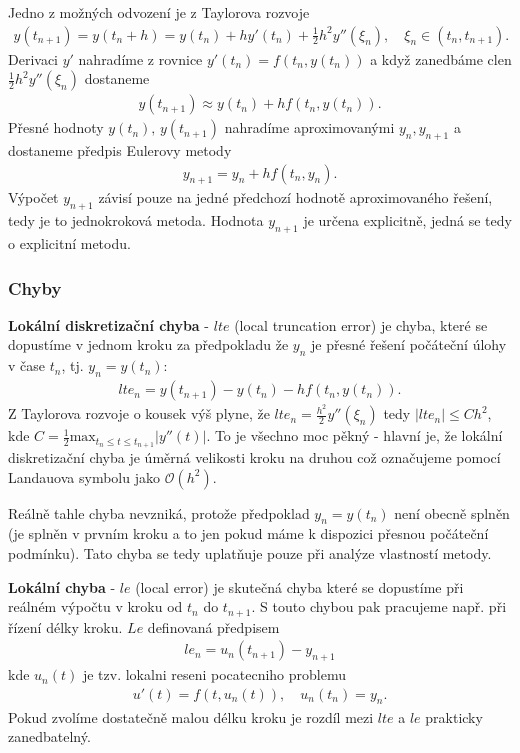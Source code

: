 \documentclass[a4]{report}
\theoremstyle{definition}
\begin{document}
{Jedno z možných odvození je z Taylorova rozvoje
\begin{align}
y(t_{n+1}) = y(t_{n}+h)= y(t_{n})+hy'(t_{n}) + \frac{1}{2} h^{2} y''(\xi_{n}), \quad \xi_{n} \in (t_{n}, t_{n+1}).
\end{align}
Derivaci $y'$ nahradíme z rovnice $y'(t_{n})=f(t_{n},y(t_{n}))$ a když zanedbáme clen $\frac{1}{2} h^{2} y''(\xi_{n})$ dostaneme
\begin{align}
y(t_{n+1}) \approx y(t_{n})+h f(t_{n},y(t_{n})).
\end{align}
Přesné hodnoty $y(t_{n}), \, y(t_{n+1})$ nahradíme aproximovanými $y_{n}, y_{n+1}$ a dostaneme předpis Eulerovy metody
\begin{align}
y_{n+1}= y_{n} + hf(t_{n}, y_{n}).
\end{align}
Výpočet $y_{n+1}$ závisí pouze na jedné předchozí hodnotě aproximovaného řešení, tedy je to jednokroková metoda. Hodnota $y_{n+1}$ je určena explicitně, jedná se tedy o explicitní metodu. 

\subsubsection*{Chyby}
\textbf{Lokální diskretizační chyba} - $lte$ (local truncation error) je chyba, které se dopustíme v jednom kroku za předpokladu že $y_{n}$ je přesné řešení počáteční úlohy v čase $t_{n}$, tj. $y_{n}=y(t_{n})$:
\begin{align}
lte_{n}= y(t_{n+1})-y(t_{n})-h f(t_{n},y(t_{n})).
\end{align}
Z Taylorova rozvoje o kousek výš plyne, že $lte_{n}=\frac{h^{2}}{2} y''(\xi_{n})$ tedy $\vert lte_{n} \vert \leq C h^{2}$, kde $C=\frac{1}{2} \mathrm{max}_{t_{n}\leq t \leq t_{n+1}} \vert y''(t) \vert $. To je všechno moc pěkný - hlavní je, že lokální diskretizační chyba je úměrná velikosti kroku na druhou což označujeme pomocí Landauova symbolu jako $\mathcal{O}(h^{2})$.

Reálně tahle chyba nevzniká, protože předpoklad $y_{n}=y(t_{n})$ není obecně splněn (je splněn v prvním kroku a to jen pokud máme k dispozici přesnou počáteční podmínku). Tato chyba se tedy uplatňuje pouze při analýze vlastností metody.  

\textbf{Lokální chyba} - $le$ (local error)  je skutečná chyba které se dopustíme při reálném výpočtu v kroku od $t_{n}$ do $t_{n+1}$. S touto chybou pak pracujeme např. při řízení délky kroku.  $Le$ definovaná předpisem
\begin{align}
le_{n}=u_{n}(t_{n+1})-y_{n+1}
\end{align}
kde $u_{n}(t)$ je tzv. lokalni reseni pocatecniho problemu
\begin{align}
u'(t)=f(t,u_{n}(t)), \quad u_{n}(t_{n})=y_{n}.
\end{align}
Pokud zvolíme dostatečně malou délku kroku je rozdíl mezi $lte$ a $le$ prakticky zanedbatelný. 

}
\end{document}
